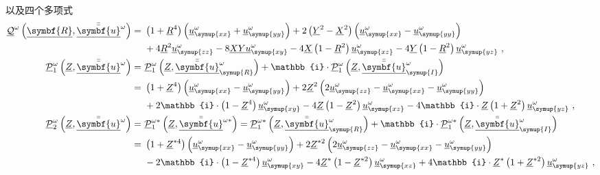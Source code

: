 以及四个多项式
\begin{subequations} \label{eq:2-60}
\begin{align}
	\underline{\mathcal{Q}}^{\omega}\left(\underline{\symbf{R}}, \bar{\bar{\underline{\symbf{u}}}}^{\omega}\right) =\ &\left(1+\underline{R}^{4}\right)\left(\underline{u}^{\omega}_{\symup{x x}}+\underline{u}^{\omega}_{\symup{y y}}\right)+2\left(\underline{Y}^{2}-\underline{X}^{2}\right)\left(\underline{u}^{\omega}_{\symup{x x}}-\underline{u}^{\omega}_{\symup{y y}}\right) \label{eq:2-60a}\\ \ & +4 \underline{R}^{2} \underline{u}^{\omega}_{\symup{z z}}-8 \underline{X} \underline{Y} \underline{u}^{\omega}_{\symup{x y}}-4 \underline{X}\left(1-\underline{R}^{2}\right) \underline{u}^{\omega}_{\symup{x z}}-4 \underline{Y}\left(1-\underline{R}^{2}\right) \underline{u}^{\omega}_{\symup{y z}} \notag~,\\
	\underline{\mathcal{P}}^{\omega}_{1}\left(\underline{Z}, \bar{\bar{\underline{\symbf{u}}}}^{\omega}\right) =\ &\underline{\mathcal{P}}^{\omega}_{1}\left(\underline{Z}, \bar{\bar{\underline{\symbf{u}}}}_{\symup{R}}^{\omega}\right) + \mathbb{i} \cdot \underline{\mathcal{P}}^{\omega}_{1}\left(\underline{Z}, \bar{\bar{\underline{\symbf{u}}}}_{\symup{I}}^{\omega}\right) \label{eq:2-60b}\\ =\ &\left(1+\underline{Z}^{4}\right)\left(\underline{u}^{\omega}_{\symup{x x}}-\underline{u}^{\omega}_{\symup{y y}}\right)+2 \underline{Z}^{2}\left(2 \underline{u}^{\omega}_{\symup{z z}}-\underline{u}^{\omega}_{\symup{x x}}-\underline{u}^{\omega}_{\symup{y y}}\right) \notag\\ \ &+2 \mathbb{i} \cdot \left(1-\underline{Z}^{4}\right) \underline{u}^{\omega}_{\symup{x y}}-4 \underline{Z}\left(1-\underline{Z}^{2}\right) \underline{u}^{\omega}_{\symup{x z}}-4 \mathbb{i} \cdot \underline{Z}\left(1+\underline{Z}^{2}\right) \underline{u}^{\omega}_{\symup{y z}} \notag ~,\\
	\underline{\mathcal{P}}^{\omega}_{2}\left(\underline{Z}, \bar{\bar{\underline{\symbf{u}}}}^{\omega}\right) =\ &{\underline{\mathcal{P}}^{\omega*}_{1}\left(\underline{Z}, \bar{\bar{\underline{\symbf{u}}}}^{\omega*}\right)=\underline{\mathcal{P}}^{\omega*}_{1}\left(\underline{Z}, \bar{\bar{\underline{\symbf{u}}}}_{\symup{R}}^{\omega}\right)+\mathbb{i} \cdot \underline{\mathcal{P}}^{\omega*}_{1}\left(\underline{Z}, \bar{\bar{\underline{\symbf{u}}}}_{\symup{I}}^{\omega}\right) } \label{eq:2-60c}\\ =\ &\left(1+\underline{Z}^{* 4}\right)\left(\underline{u}^{\omega}_{\symup{x x}}-\underline{u}^{\omega}_{\symup{y y}}\right)+2 \underline{Z}^{* 2}\left(2 \underline{u}^{\omega}_{\symup{z z}}-\underline{u}^{\omega}_{\symup{x x}}-\underline{u}^{\omega}_{\symup{y y}}\right) \notag\\ \ &-2 \mathbb{i} \cdot \left(1-\underline{Z}^{* 4}\right) \underline{u}^{\omega}_{\symup{x y}}-4 \underline{Z}^{*}\left(1-\underline{Z}^{* 2}\right) \underline{u}^{\omega}_{\symup{x z}}+4 \mathbb{i} \cdot \underline{Z}^{*}\left(1+\underline{Z}^{* 2}\right) \underline{u}^{\omega}_{\symup{y z}} \notag ~,\\

\end{align}
\end{subequations}
